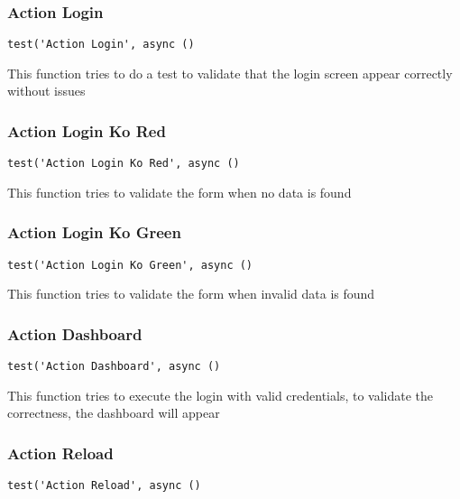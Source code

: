 \documentclass[a4paper]{article}
\begin{document}
\hypertarget{toc464}{}
\subsubsection{Action Login}

\begin{lstlisting}
test('Action Login', async ()
\end{lstlisting}

This function tries to do a test to validate that the login screen appear
correctly without issues

\hypertarget{toc465}{}
\subsubsection{Action Login Ko Red}

\begin{lstlisting}
test('Action Login Ko Red', async ()
\end{lstlisting}

This function tries to validate the form when no data is found

\hypertarget{toc466}{}
\subsubsection{Action Login Ko Green}

\begin{lstlisting}
test('Action Login Ko Green', async ()
\end{lstlisting}

This function tries to validate the form when invalid data is found

\hypertarget{toc467}{}
\subsubsection{Action Dashboard}

\begin{lstlisting}
test('Action Dashboard', async ()
\end{lstlisting}

This function tries to execute the login with valid credentials, to validate
the correctness, the dashboard will appear

\hypertarget{toc468}{}
\subsubsection{Action Reload}

\begin{lstlisting}
test('Action Reload', async ()
\end{lstlisting}
\end{document}
